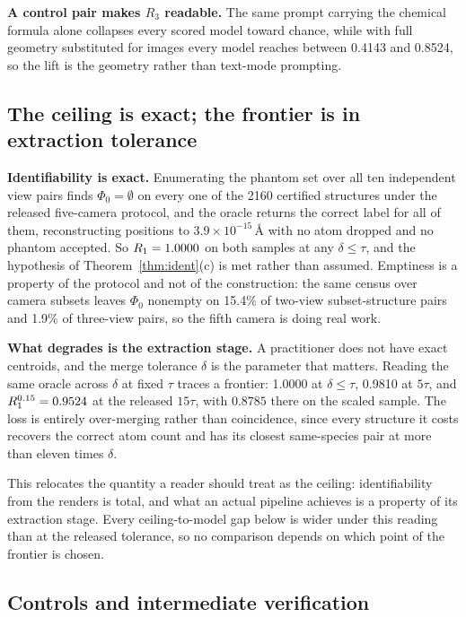 \textbf{A control pair makes $R_3$ readable.} The same prompt carrying the chemical formula alone collapses
every scored model toward chance, while with full geometry substituted for images every model reaches between
0.4143 and 0.8524, so the lift is the geometry rather than text-mode prompting.

\subsection{The ceiling is exact; the frontier is in extraction tolerance}
\label{sec:frontier}

\textbf{Identifiability is exact.} Enumerating the phantom set over all ten independent view pairs finds
$\Phi_0 = \emptyset$ on every one of the 2160 certified structures under the released five-camera protocol,
and the oracle returns the correct label for all of them, reconstructing positions to
$3.9\times10^{-15}$\,\AA{} with no atom dropped and no phantom accepted. So $R_1 = 1.0000$ on both samples
at any $\delta \le \tau$, and the hypothesis of Theorem~\ref{thm:ident}(c) is met rather than assumed.
Emptiness is a property of the protocol and not of the construction: the same census over camera subsets
leaves $\Phi_0$ nonempty on 15.4\% of two-view subset-structure pairs and 1.9\% of three-view pairs, so the
fifth camera is doing real work.

\textbf{What degrades is the extraction stage.} A practitioner does not have exact centroids, and the merge
tolerance $\delta$ is the parameter that matters. Reading the same oracle across $\delta$ at fixed $\tau$
traces a frontier: 1.0000 at $\delta \le \tau$, 0.9810 at $5\tau$, and
$R_1^{0.15} = 0.9524$ at the released $15\tau$, with $0.8785$ there on the scaled sample. The loss is entirely
over-merging rather than coincidence, since every structure it costs recovers the correct atom count and has
its closest same-species pair at more than eleven times $\delta$.

This relocates the quantity a reader should treat as the ceiling: identifiability from the renders is total,
and what an actual pipeline achieves is a property of its extraction stage. Every ceiling-to-model gap below
is wider under this reading than at the released tolerance, so no comparison depends on which point of the
frontier is chosen.

\subsection{Controls and intermediate verification}
\label{sec:controls}


